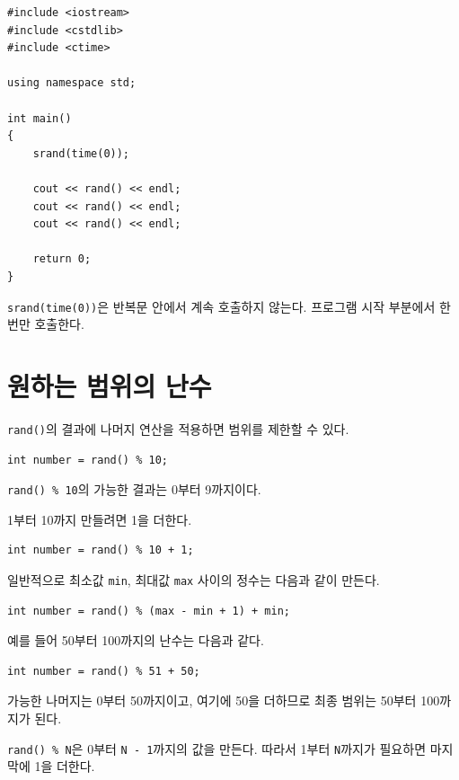 \documentclass[11pt,a4paper]{article}
\begin{document}
\begin{lstlisting}
#include <iostream>
#include <cstdlib>
#include <ctime>

using namespace std;

int main()
{
    srand(time(0));

    cout << rand() << endl;
    cout << rand() << endl;
    cout << rand() << endl;

    return 0;
}
\end{lstlisting}

\begin{importantbox}
\texttt{srand(time(0))}은 반복문 안에서 계속 호출하지 않는다.
프로그램 시작 부분에서 한 번만 호출한다.
\end{importantbox}

\section{원하는 범위의 난수}

\texttt{rand()}의 결과에 나머지 연산을 적용하면 범위를 제한할 수 있다.

\begin{lstlisting}
int number = rand() % 10;
\end{lstlisting}

\texttt{rand() \% 10}의 가능한 결과는 0부터 9까지이다.

1부터 10까지 만들려면 1을 더한다.

\begin{lstlisting}
int number = rand() % 10 + 1;
\end{lstlisting}

일반적으로 최소값 \texttt{min}, 최대값 \texttt{max} 사이의 정수는 다음과 같이 만든다.

\begin{lstlisting}
int number = rand() % (max - min + 1) + min;
\end{lstlisting}

예를 들어 50부터 100까지의 난수는 다음과 같다.

\begin{lstlisting}
int number = rand() % 51 + 50;
\end{lstlisting}

가능한 나머지는 0부터 50까지이고, 여기에 50을 더하므로
최종 범위는 50부터 100까지가 된다.

\begin{checkpointbox}
\texttt{rand() \% N}은 0부터 \texttt{N - 1}까지의 값을 만든다.
따라서 1부터 \texttt{N}까지가 필요하면 마지막에 1을 더한다.
\end{checkpointbox}
\end{document}
